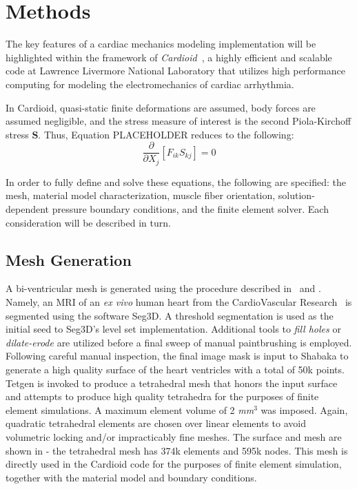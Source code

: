 \section{Methods}
\label{Methods}

The key features of a cardiac mechanics modeling implementation will be highlighted within the framework of \textit{Cardioid}~\cite{mirin_2012, gurev_2015}, a highly efficient and scalable code at Lawrence Livermore National Laboratory that utilizes high performance computing for modeling the electromechanics of cardiac arrhythmia.

In Cardioid, quasi-static finite deformations are assumed, body forces are assumed negligible, and the stress measure of interest is the second Piola-Kirchoff stress $\bm{S}$. Thus, Equation PLACEHOLDER reduces to the following:
\begin{equation}
\frac{\partial}{\partial{X_j}}\left[F_{ik}S_{kj}\right] = 0
\end{equation}

In order to fully define and solve these equations, the following are specified: the mesh, material model characterization, muscle fiber orientation, solution-dependent pressure boundary conditions, and the finite element solver. Each consideration will be described in turn.

\subsection{Mesh Generation}
\label{Mesh Generation}

A bi-ventricular mesh is generated using the procedure described in~ and . Namely, an MRI of an \textit{ex vivo} human heart from the CardioVascular Research~\cite{cvgg} is segmented using the software Seg3D. A threshold segmentation is used as the initial seed to Seg3D's level set implementation. Additional tools to \textit{fill holes} or \textit{dilate-erode} are utilized before a final sweep of manual paintbrushing is employed. Following careful manual inspection, the final image mask is input to Shabaka to generate a high quality surface of the heart ventricles with a total of 50k points. Tetgen is invoked to produce a tetrahedral mesh that honors the input surface and attempts to produce high quality tetrahedra for the purposes of finite element simulations. A maximum element volume of 2 \textit{mm$^3$} was imposed. Again, quadratic tetrahedral elements are chosen over linear elements to avoid volumetric locking and/or impracticably fine meshes. The surface and mesh are shown in  - the tetrahedral mesh has 374k elements and 595k nodes. This mesh is directly used in the Cardioid code for the purposes of finite element simulation, together with the material model and boundary conditions.

